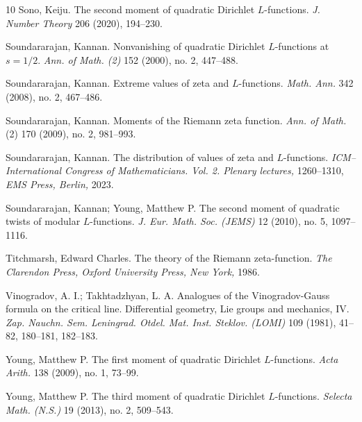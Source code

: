 \documentclass[12pt,reqno]{amsart}
\numberwithin{equation}{section}
\theoremstyle{plain}
\theoremstyle{definition}
\theoremstyle{remark}
\begin{document}
\begin{thebibliography}{10}
Sono, Keiju.
The second moment of quadratic Dirichlet $L$-functions.
\emph{J. Number Theory} 206 (2020), 194--230.

Soundararajan, Kannan.
Nonvanishing of quadratic Dirichlet $L$-functions at $s=1/2$.
\emph{ Ann. of Math. (2)} 152 (2000), no. 2, 447--488.

Soundararajan, Kannan.
Extreme values of zeta and $L$-functions.
\emph{Math. Ann.} 342 (2008), no. 2, 467--486.

Soundararajan, Kannan.
Moments of the Riemann zeta function.
\emph{Ann. of Math.} (2) 170 (2009), no. 2, 981--993.

Soundararajan, Kannan.
The distribution of values of zeta and $L$-functions.
\emph{ICM--International Congress of Mathematicians. Vol. 2. Plenary lectures,} 1260--1310, \emph{EMS Press, Berlin,} 2023.

Soundararajan, Kannan; Young, Matthew P.
The second moment of quadratic twists of modular $L$-functions.
\emph{J. Eur. Math. Soc. (JEMS)} 12 (2010), no. 5, 1097--1116.

Titchmarsh, Edward Charles.
The theory of the Riemann zeta-function. %
\emph{The Clarendon Press, Oxford University Press, New York,} 1986.

Vinogradov, A. I.; Takhtadzhyan, L. A. Analogues of the Vinogradov-Gauss formula on the critical line.
Differential geometry, Lie groups and mechanics, IV.
\emph{Zap. Nauchn. Sem. Leningrad. Otdel. Mat. Inst. Steklov. (LOMI)} 109 (1981), 41--82, 180--181, 182--183.

Young, Matthew P.
The first moment of quadratic Dirichlet $L$-functions.
\emph{Acta Arith.} 138 (2009), no. 1, 73--99.

Young, Matthew P.
The third moment of quadratic Dirichlet $L$-functions.
\emph{Selecta Math. (N.S.)} 19 (2013), no. 2, 509--543.

\end{thebibliography}
\end{document}
